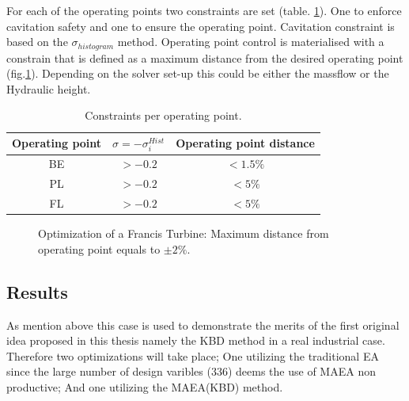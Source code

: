 For each of the operating points two constraints are set (table. \ref{Cons}). One to enforce cavitation safety and one to ensure the operating point. Cavitation constraint is based on the $\sigma_{histogram}$ method. Operating point control is materialised with a constrain that is defined as a maximum distance from the desired operating point (fig.\ref{design-obj3}). Depending on the solver set-up this could be either the massflow or the Hydraulic height.     


\begin{table}[h!]
\begin{center}
\begin{tabular}{ |c|c|c| }
\hline
Operating point & $\sigma = -\sigma_i^{Hist}$ & Operating point distance\\
\hline
BE & $> -0.2$ & $<1.5\%$\\
\hline
PL       & $> -0.2$ & $<5\%$\\
\hline
FL       & $> -0.2$ & $<5\%$\\
\hline
\end{tabular}
\caption{Constraints per operating point.}
\label{Cons}
\end{center}
\end{table}


\begin{figure}[h!]
\begin{minipage}[b]{1\linewidth}
 \centering
\end{minipage}
\caption{Optimization of a Francis Turbine: Maximum distance from operating point equals to $\pm2\%$.}
\label{design-obj3}
\end{figure}

\subsection{Results}
As mention above this case is used to demonstrate the merits of the first original idea proposed in this thesis namely the KBD method in a real industrial case. Therefore two optimizations will take place; One utilizing the traditional EA since the large number of design varibles ($336$) deems the use of MAEA non productive; And one utilizing the MAEA(KBD) method.

